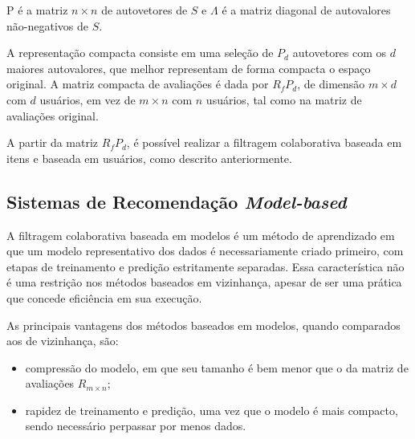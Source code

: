 P é a matriz $n \times n$ de autovetores de $S$ e $\Lambda$ é a matriz diagonal
de autovalores não-negativos de $S$.

A representação compacta consiste em uma seleção de $P_d$ autovetores com os $d$
maiores autovalores, que melhor representam de forma compacta o espaço original.
A matriz compacta de avaliações é dada por $R_{f}P_{d}$, de dimensão $m \times
d$ com $d$ usuários, em vez de $m \times n$ com $n$ usuários, tal como na matriz
de avaliações original.

A partir da matriz $R_{f}P_{d}$, é possível realizar a filtragem colaborativa
baseada em itens e baseada em usuários, como descrito anteriormente.


\subsection{Sistemas de Recomendação \textit{Model-based}}
A filtragem colaborativa baseada em modelos é um método de aprendizado em que um
modelo representativo dos dados é necessariamente criado primeiro, com etapas de
treinamento e predição estritamente separadas. Essa característica  não é uma
restrição nos métodos baseados em vizinhança, apesar de ser uma prática que
concede eficiência em sua execução.

As principais vantagens dos métodos baseados em modelos, quando comparados aos de vizinhança, são:
\begin{itemize}
    \item compressão do modelo, em que seu tamanho é bem menor que o da matriz de avaliações $R_{m \times n}$;
    \item rapidez de treinamento e predição, uma vez que o modelo é mais compacto, sendo necessário perpassar por menos dados.
\end{itemize}
